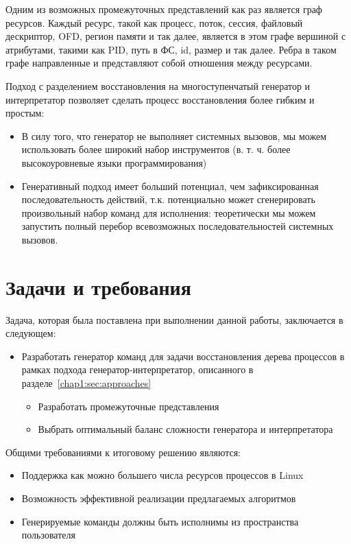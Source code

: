 Одним из возможных промежуточных представлений как раз является граф ресурсов. Каждый ресурс, такой как процесс, поток, сессия, файловый дескриптор, OFD, регион памяти и так далее, является в этом графе вершиной с атрибутами, такими как PID, путь в ФС, id, размер и так далее. Ребра в таком графе направленные и представляют собой отношения между ресурсами.

Подход с разделением восстановления на многоступенчатый генератор и интерпретатор позволяет сделать процесс восстановления более гибким и простым:
\begin{itemize}
	\item В силу того, что генератор не выполняет системных вызовов, мы можем использовать более широкий набор инструментов (в. т. ч. более высокоуровневые языки программирования)
	\item Генеративный подход имеет больший потенциал, чем зафиксированная последовательность действий, т.к. потенциально может сгенерировать произвольный набор команд для исполнения: теоретически мы можем запустить полный перебор всевозможных последовательностей системных вызовов.
\end{itemize}

\section{Задачи и требования}

Задача, которая была поставлена при выполнении данной работы, заключается в следующем:

\begin{itemize}
	\item Разработать генератор команд для задачи восстановления дерева процессов в рамках подхода генератор-интерпретатор, описанного в разделе~\ref{chap1:sec:approaches}
	\begin{itemize}
		\item Разработать промежуточные представления
		\item Выбрать оптимальный баланс сложности генератора и интерпретатора
	\end{itemize}
\end{itemize}

Общими требованиями к итоговому решению являются:
\begin{itemize}
	\item Поддержка как можно большего числа ресурсов процессов в Linux
	\item Возможность эффективной реализации предлагаемых алгоритмов
	\item Генерируемые команды должны быть исполнимы из пространства пользователя
\end{itemize}

